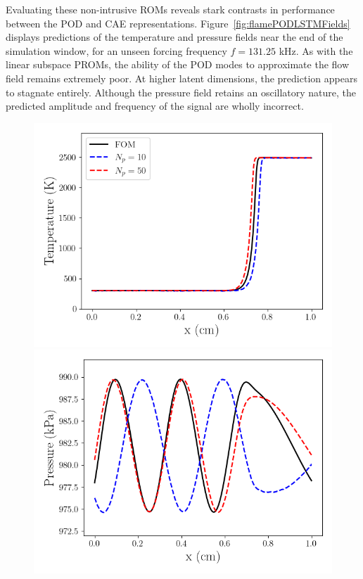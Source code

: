 Evaluating these non-intrusive ROMs reveals stark contrasts in performance between the POD and CAE representations. Figure~\ref{fig:flamePODLSTMFields} displays predictions of the temperature and pressure fields near the end of the simulation window, for an unseen forcing frequency $f = 131.25$ kHz. As with the linear subspace PROMs, the ability of the POD modes to approximate the flow field remains extremely poor. At higher latent dimensions, the prediction appears to stagnate entirely. Although the pressure field retains an oscillatory nature, the predicted amplitude and frequency of the signal are wholly incorrect.

\begin{figure}
    \begin{minipage}{0.49\linewidth}
        \includegraphics[width=0.99\linewidth]{Chapters/TransientFlame/Images/lstm/cae_rom_temp_snaps.png}
    \end{minipage}
    \begin{minipage}{0.49\linewidth}
        \includegraphics[width=0.99\linewidth]{Chapters/TransientFlame/Images/lstm/cae_rom_press_snaps.png}

\end{minipage}
\end{figure}
